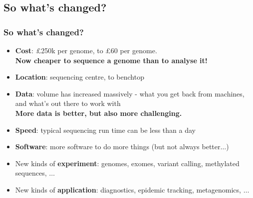 \subsection{So what's changed?}

\begin{frame}
  \frametitle{So what's changed?}
  \begin{itemize}
    \item \textbf{Cost}: \pounds250k per genome, to \pounds60 per genome. \\
             \textbf{Now cheaper to sequence a genome than to analyse it!}
    \item \textbf{Location}: sequencing centre, to benchtop
    \item \textbf{Data}: volume has increased massively - what you get back from machines, and what's out there to work with\\
             \textbf{More data is better, but also more challenging.}
    \item \textbf{Speed}: typical sequencing run time can be less than a day
    \item \textbf{Software}: more software to do more things (but not always better$\ldots$)
    \item New kinds of \textbf{experiment}: genomes, exomes, variant calling, methylated sequences, $\ldots$
    \item New kinds of \textbf{application}: diagnostics, epidemic tracking, metagenomics, $\ldots$
  \end{itemize}       
\end{frame}